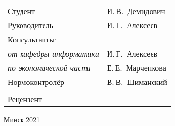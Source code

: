 \begin{titlepage}
\begin{center}
    \begin{tabular}{ p{}p{} }
      Студент & И.\,В.~Демидович \\
      Руководитель & И.\,Г.~Алексеев \\
      Консультанты: &\\
      \hspace*{3ex}\emph{от кафедры информатики} & И.\,Г.~Алексеев \\
      \hspace*{3ex}\emph{по экономической части} & Е.\,Е.~Марченкова \\
      Нормоконтролёр & В.\,В.~Шиманский\\
      & \\
      Рецензент &
    \end{tabular}
    
    \vfill
    {\normalsize Минск 2021}
  \end{center}
\end{titlepage}
